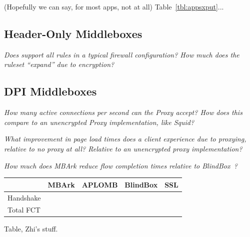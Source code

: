 (Hopefully we can say, for most apps, not at all)
Table~\ref{tbl:appsxput}...


\subsection{Header-Only Middleboxes}


 {\it Does \sys support all rules in a typical firewall configuration? How much does the ruleset ``expand'' due to encryption?}



\subsection{DPI Middleboxes}

{\it How many active connections per second can the Proxy accept? How does this compare to an unencrypted Proxy implementation, like Squid?}

{\it What improvement in page load times does a client experience due to proxying, relative to no proxy at all? Relative to an unencrypted proxy implementation?}

{\it How much does MBArk reduce flow completion times relative to BlindBox~\cite{blindbox}?}

\begin{table}[h]
\centering
\begin{tabular}{l|l|l|l|l}
&MBArk&APLOMB&BlindBox&SSL\\
\hline
\hline
Handshake&&&&\\
\hline
Total FCT&&&&\\
\end{tabular}

\end{table}

Table, Zhi's stuff.
